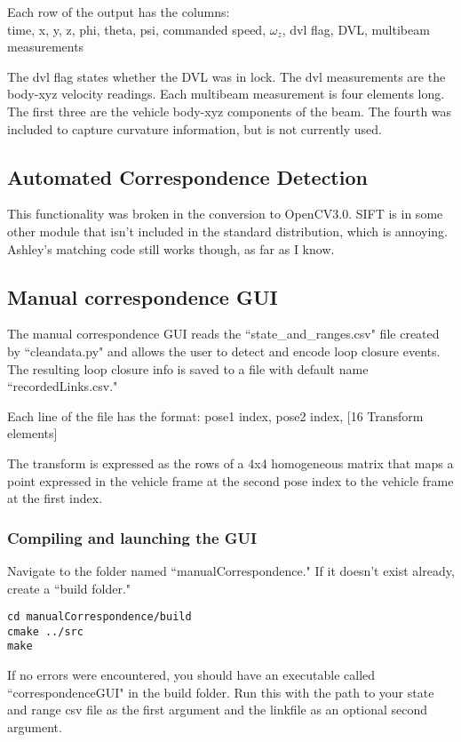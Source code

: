 \documentclass[12pt]{amsart}
\begin{document}
Each row of the output has the columns:\\
time, x, y, z, phi, theta, psi, commanded speed, $\omega_z$, dvl flag, DVL, multibeam measurements

The dvl flag states whether the DVL was in lock. The dvl measurements are the body-xyz velocity readings. Each multibeam measurement is four elements long. The first three are the vehicle body-xyz components of the beam. The fourth was included to capture curvature information, but is not currently used.

\subsection{Automated Correspondence Detection}

This functionality was broken in the conversion to OpenCV3.0. SIFT is in some other module that isn't included in the standard distribution, which is annoying. Ashley's matching code still works though, as far as I know.

\subsection{Manual correspondence GUI}

The manual correspondence GUI reads the ``state\_and\_ranges.csv" file created by ``cleandata.py" and allows the user to detect and encode loop closure events. The resulting loop closure info is saved to a file with default name ``recordedLinks.csv." 

Each line of the file has the format:
pose1 index, pose2 index, [16 Transform elements]

The transform is expressed as the rows of a 4x4 homogeneous matrix that maps a point expressed in the vehicle frame at the second pose index to the vehicle frame at the first index.

\subsubsection{Compiling and launching the GUI}

Navigate to the folder named ``manualCorrespondence." If it doesn't exist already, create a ``build folder."

\begin{lstlisting}
cd manualCorrespondence/build
cmake ../src
make
\end{lstlisting} 

If no errors were encountered, you should have an executable called ``correspondenceGUI" in the build folder. Run this with the path to your state and range csv file as the first argument and the linkfile as an optional second argument.
\end{document}

